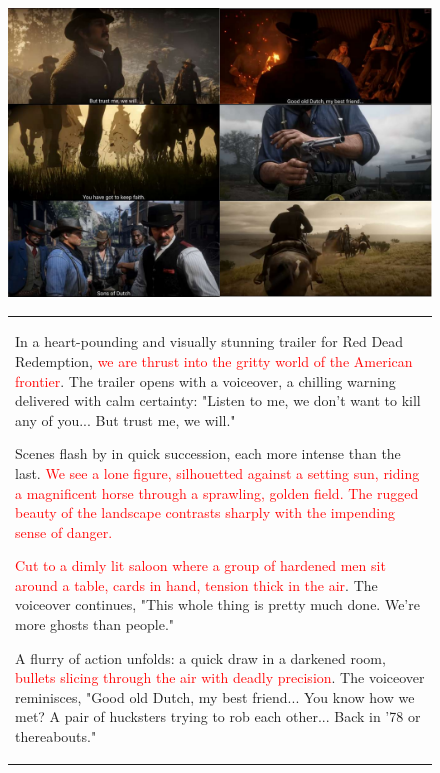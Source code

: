 \begin{landscape}
    
\begin{figure}[!t]
\begin{minipage}[c]{0.8\textwidth}
        \centering
        \includegraphics[width=\textwidth]{images/red-dead-game-video-1_compressed.pdf}
\end{minipage}
\begin{minipage}[c]{0.9\textwidth}
\small
\centering
\scriptsize
\begin{tabular}{p{10cm}}
In a heart-pounding and visually stunning trailer for Red Dead Redemption, \textcolor{red}{we are thrust into the gritty world of the American frontier}. The trailer opens with a voiceover, a chilling warning delivered with calm certainty: "Listen to me, we don’t want to kill any of you... But trust me, we will."

Scenes flash by in quick succession, each more intense than the last. \textcolor{red}{We see a lone figure, silhouetted against a setting sun, riding a magnificent horse through a sprawling, golden field. The rugged beauty of the landscape contrasts sharply with the impending sense of danger.}

\textcolor{red}{Cut to a dimly lit saloon where a group of hardened men sit around a table, cards in hand, tension thick in the air}. The voiceover continues, "This whole thing is pretty much done. We're more ghosts than people."

A flurry of action unfolds: a quick draw in a darkened room, \textcolor{red}{bullets slicing through the air with deadly precision}. The voiceover reminisces, "Good old Dutch, my best friend... You know how we met? A pair of hucksters trying to rob each other... Back in '78 or thereabouts."


\end{tabular}
\end{minipage}
\end{figure}
\end{landscape}
